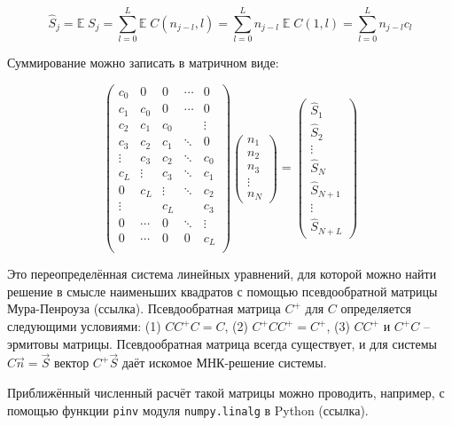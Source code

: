 \documentclass[12pt]{article}
\begin{document}
	\begin{equation}
		\hat{S}_j = \mathbb{E} \; S_j = \sum_{l=0}^{L} \mathbb{E} \; C(n_{j-l}, l) = \sum_{l=0}^{L} n_{j-l} \; \mathbb{E} \; C(1, l) = \sum_{l=0}^{L} n_{j-l} c_l
	\end{equation}

	Суммирование можно записать в матричном виде:
	
	\begin{equation}
		\begin{pmatrix} 
			c_0   &  0   &  0   &\dotsm&  0     \\
			c_1   & c_0  &  0   &\dotsm&  0     \\
			c_2   & c_1  & c_0  &      & \vdots \\
			c_3   & c_2  & c_1  &\ddots&  0     \\
     	    \vdots& c_3  & c_2  &\ddots&  c_0   \\
			c_L   &\vdots& c_3  &\ddots&  c_1   \\
			0     & c_L  &\vdots&\ddots&  c_2   \\
			\vdots&      & c_L  &      &  c_3   \\
			0     &\dotsm&  0   &\ddots& \vdots \\
			0     &\dotsm& 0    &   0  &  c_L   \\
		\end{pmatrix}
		\begin{pmatrix} 
			n_1 \\ n_2 \\ n_3 \\ \vdots \\ n_N
		\end{pmatrix}
		=
		\begin{pmatrix} 
			\hat{S}_1 \\ \hat{S}_2 \\
			\vdots \\
			\hat{S}_N \\ \hat{S}_{N+1} \\
			\vdots \\
			\hat{S}_{N+L}
		\end{pmatrix}
		\label{eq:mean_matrix}
	\end{equation}

	Это переопределённая система линейных уравнений, для которой можно найти решение в смысле наименьших квадратов с помощью псевдообратной матрицы Мура-Пенроуза (ссылка). Псевдообратная матрица $C^+$ для $C$ определяется следующими условиями: (1) $C C^+ C = C$, (2) $C^+ C C^+ = C^+$, (3) $C C^+$ и $C^+ C$ -- эрмитовы матрицы. Псевдообратная матрица всегда существует, и для системы $C\vec{n} = \vec{S}$ вектор $C^+ \vec{S}$ даёт искомое МНК-решение системы.
	
	Приближённый численный расчёт такой матрицы можно проводить, например, с помощью функции \verb|pinv| модуля \verb|numpy.linalg| в Python (ссылка).
	
\end{document}
